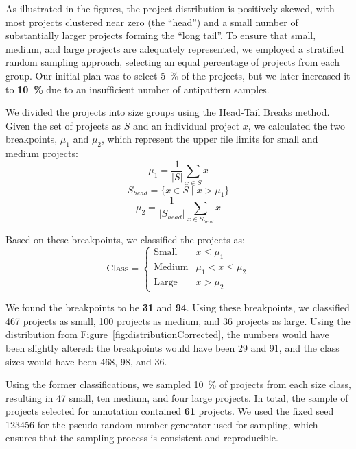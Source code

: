 As illustrated in the figures, the project distribution is positively skewed, with most projects clustered near zero (the “head”) and a small number of substantially larger projects forming the “long tail”. To ensure that small, medium, and large projects are adequately represented, we employed a stratified random sampling approach, selecting an equal percentage of projects from each group. Our initial plan was to select \qty{5}{\percent} of the projects, but we later increased it to \textbf{\qty{10}{\percent}} due to an insufficient number of antipattern samples.

We divided the projects into size groups using the Head-Tail Breaks method. Given the set of projects as \(S\) and an individual project \(x\), we calculated the two breakpoints, \(\mu_1\) and \(\mu_2\), which represent the upper file limits for small and medium projects:
\begin{equation}
\mu_1 = \frac{1}{|S|} \sum_{x \in S} x
\end{equation}
\begin{equation}
S_{head} = \{ x \in S \mid x > \mu_1 \}
\end{equation}
\begin{equation}
\mu_2 = \frac{1}{|S_{head}|} \sum_{x \in S_{head}} x
\end{equation}

Based on these breakpoints, we classified the projects as:
\begin{equation}
\text{Class} = \begin{cases} 
      \text{Small} & x \le \mu_1 \\
      \text{Medium} & \mu_1 < x \le \mu_2 \\
      \text{Large} & x > \mu_2 
   \end{cases}
\end{equation}

We found the breakpoints to be \textbf{\num{31}} and \textbf{\num{94}}. Using these breakpoints, we classified \num{467} projects as small, \num{100} projects as medium, and \num{36} projects as large. Using the distribution from Figure~\ref{fig:distributionCorrected}, the numbers would have been slightly altered: the breakpoints would have been \num{29} and \num{91}, and the class sizes would have been \num{468}, \num{98}, and \num{36}.

Using the former classifications, we sampled \qty{10}{\percent} of projects from each size class, resulting in \num{47} small, ten medium, and four large projects. In total, the sample of projects selected for annotation contained \textbf{61} projects. We used the fixed seed \num{123456} for the pseudo-random number generator used for sampling, which ensures that the sampling process is consistent and reproducible.

